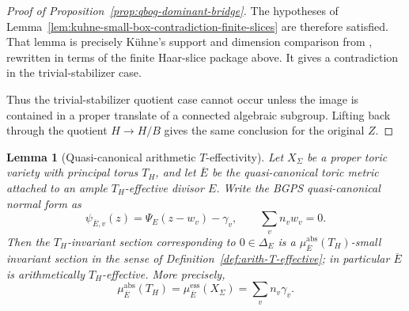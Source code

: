 \documentclass[10pt,a4paper]{amsart}
\theoremstyle{plain}
\newtheorem{lemma}[theorem]{Lemma}
\theoremstyle{plain}
\numberwithin{equation}{section}
\providecommand{\bE}{\overline{E}}
\providecommand{\muess}{\mu^{\mathrm{ess}}}
\providecommand{\muabs}{\mu^{\mathrm{abs}}}
\begin{document}
\begin{proof}[Proof of Proposition~\ref{prop:qbog-dominant-bridge}]
	The hypotheses of
	Lemma~\ref{lem:kuhne-small-box-contradiction-finite-slices} are therefore
	satisfied.  That lemma is precisely K\"uhne's support and dimension comparison
	from \cite[pp.~2119--2121, Section~5]{Ku1}, rewritten in terms of the finite
	Haar-slice package above.  It gives a contradiction in the
	trivial-stabilizer case.
	
	Thus the trivial-stabilizer quotient case cannot occur unless the image is
	contained in a proper translate of a connected algebraic subgroup.  Lifting
	back through the quotient \(H\to H/B\) gives the same conclusion for the
	original \(Z\).
\end{proof}

\begin{lemma}[Quasi-canonical arithmetic \(T\)-effectivity]
	\label{lem:qcanonical-arith-teff-normalization}
	Let \(X_\Sigma\) be a proper toric variety with principal torus \(T_H\), and
	let \(\bE\) be the quasi-canonical toric metric attached to an ample
	\(T_H\)-effective divisor \(E\).  Write the BGPS quasi-canonical normal form as
	\[
	\psi_{\bE,v}(z)=\Psi_E(z-w_v)-\gamma_v,
	\qquad
	\sum_vn_vw_v=0.
	\]
	Then the \(T_H\)-invariant section corresponding to
	\(0\in\Delta_E\) is a \(\muabs_{\bE}(T_H)\)-small invariant section in the
	sense of Definition~\ref{def:arith-T-effective}; in particular
	\(\bE\) is arithmetically \(T_H\)-effective.  More precisely,
	\[
	\muabs_{\bE}(T_H)=\muess_{\bE}(X_\Sigma)=\sum_vn_v\gamma_v.
	\]
\end{lemma}
\end{document}
